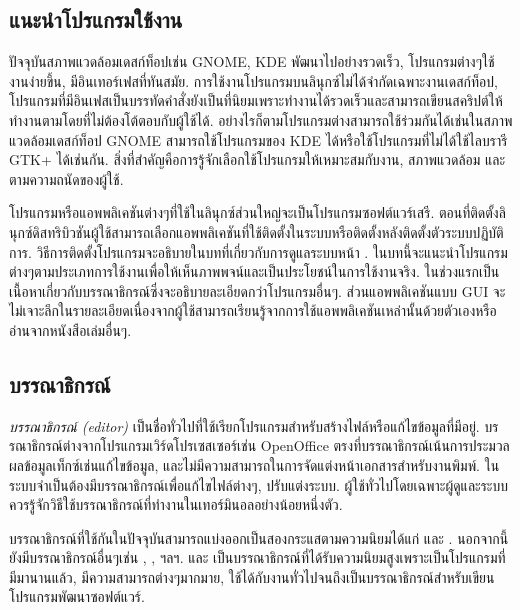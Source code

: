 \begin{thwbr}
\chapter{แนะนำโปรแกรมใช้งาน}
ปัจจุบันสภาพแวดล้อมเดสก์ท็อปเช่น GNOME, KDE พัฒนาไปอย่างรวดเร็ว, โปรแกรมต่างๆใช้งานง่ายขึ้น, มีอินเทอร์เฟสที่ทันสมัย. การใช้งานโปรแกรมบนลินุกซ์ไม่ได้จำกัดเฉพาะงานเดสก์ท็อป, โปรแกรมที่มีอินเฟสเป็นบรรทัดคำสั่งยังเป็นที่นิยมเพราะทำงานได้รวดเร็วและสามารถเขียนสคริปต์ให้ทำงานตามโดยที่ไม่ต้องโต้ตอบกับผู้ใช้ได้.  อย่างไรก็ตามโปรแกรมต่างสามารถใช้ร่วมกันได้เช่นในสภาพแวดล้อมเดสก์ท็อป GNOME สามารถใช้โปรแกรมของ KDE ได้หรือใช้โปรแกรมที่ไม่ได้ใช้ไลบรารี GTK+ ได้เช่นกัน. สิ่งที่สำคัญคือการรู้จักเลือกใช้โปรแกรมให้เหมาะสมกับงาน, สภาพแวดล้อม และตามความถนัดของผู้ใช้.

โปรแกรมหรือแอพพลิเคชันต่างๆที่ใช้ในลินุกซ์ส่วนใหญ่จะเป็นโปรแกรมซอฟต์แวร์เสรี. ตอนที่ติดตั้งลินุกซ์ดิสทริบิวชันผู้ใช้สามารถเลือกแอพพลิเคชันที่ใช้ติดตั้งในระบบหรือติดตั้งหลังติดตั้งตัวระบบปฏิบัติการ. วิธีการติดตั้งโปรแกรมจะอธิบายในบทที่เกี่ยวกับการดูแลระบบหน้า \pageref{sec:install}. ในบทนี้จะแนะนำโปรแกรมต่างๆตามประเภทการใช้งานเพื่อให้เห็นภาพพจน์และเป็นประโยชน์ในการใช้งานจริง. ในช่วงแรกเป็นเนื้อหาเกี่ยวกับบรรณาธิกรณ์ซึ่งจะอธิบายละเอียดกว่าโปรแกรมอื่นๆ. ส่วนแอพพลิเคชันแบบ GUI จะไม่เจาะลึกในรายละเอียดเนื่องจากผู้ใช้สามารถเรียนรู้จากการใช้แอพพลิเคชันเหล่านั้นด้วยตัวเองหรืออ่านจากหนังสือเล่มอื่นๆ.

\section{บรรณาธิกรณ์}
\emph{บรรณาธิกรณ์ (editor)} เป็นชื่อทั่วไปที่ใช้เรียกโปรแกรมสำหรับสร้างไฟล์หรือแก้ไขข้อมูลที่มีอยู่. บรรณาธิกรณ์ต่างจากโปรแกรมเวิร์ดโปรเซสเซอร์เช่น OpenOffice ตรงที่บรรณาธิกรณ์เน้นการประมวลผลข้อมูลเท็กซ์เช่นแก้ไขข้อมูล, และไม่มีความสามารถในการจัดแต่งหน้าเอกสารสำหรับงานพิมพ์. ในระบบจำเป็นต้องมีบรรณาธิกรณ์เพื่อแก้ไขไฟล์ต่างๆ, ปรับแต่งระบบ. ผู้ใช้ทั่วไปโดยเฉพาะผู้ดูและระบบควรรู้จักวิธีใช้บรรณาธิกรณ์ที่ทำงานในเทอร์มินอลอย่างน้อยหนึ่งตัว.

บรรณาธิกรณ์ที่ใช้กันในปัจจุบันสามารถแบ่งออกเป็นสองกระแสตามความนิยมได้แก่  และ . นอกจากนี้ยังมีบรรณาธิกรณ์อื่นๆเช่น , ,  ฯลฯ.  และ  เป็นบรรณาธิกรณ์ที่ได้รับความนิยมสูงเพราะเป็นโปรแกรมที่มีมานานแล้ว, มีความสามารถต่างๆมากมาย, ใช้ได้กับงานทั่วไปจนถึงเป็นบรรณาธิกรณ์สำหรับเขียนโปรแกรมพัฒนาซอฟต์แวร์.


\end{thwbr}

